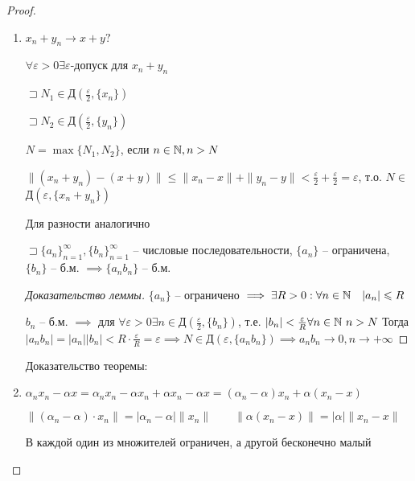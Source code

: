     \begin{proof}
        \begin{enumerate}
            \item $x_{n} + y_{n} \to  x+y? $

                $\forall \varepsilon>0 \exists \varepsilon$-допуск для $x_{n} +y_{n} $

                $\sqsupset N_1\in $Д$(\frac{\varepsilon}{2}, \{x_{n} \})$

                $\sqsupset N_2\in$Д$\left( \frac{\varepsilon}{2}, \{y_{n} \} \right) $

                $N = \max\{N_1, N_2\}$, если $n\in \mathbb{N} , n>N$

                $\|(x_{n} +y_{n} ) - (x+y)\|\leqslant \|x_{n} -x\| + \|y_{n} -y\| <\frac{\varepsilon}{2} + \frac{\varepsilon}{2} = \varepsilon$, т.о. $N\in $Д$\left( \varepsilon, \{x_{n} + y_{n} \} \right) $

                Для разности аналогично

                \begin{lemma}
                    $\sqsupset \{a_n\}_{n=1}^{\infty }, \{b_n\}_{n=1}^{\infty }    $ -- числовые последовательности, $\{a_n\}$ -- ограничена, $\{b_n\}$ -- б.м. $\implies  \{a_nb_n\}$ -- б.м.
                \end{lemma}
                \begin{proof}
                    [Доказательство леммы]

                    $\{a_n\}$ -- ограничено $\implies \exists R>0: \forall n\in \mathbb{N} \quad |a_n| \leqslant R$

                    $b_n$ -- б.м. $\implies $ для $\forall \varepsilon>0 \exists n\in \text{Д}\left( \frac{\varepsilon}{2}, \{b_n\} \right) $, т.е. $|b_n|<\frac{\varepsilon}{R} \forall n\in \mathbb{N}  ~ n>N$ Тогда $|a_nb_n| = |a_n| |b_n| <R\cdot \frac{\varepsilon}{R} = \varepsilon \implies N\in \text{Д}\left( \varepsilon, \{a_nb_n\} \right) \implies a_nb_n \to 0, n\to  +\infty  $
                \end{proof}
            Доказательство теоремы:

        \item $\alpha_nx_n - \alpha x = \alpha_nx_n - \alpha x_n + \alpha x_n - \alpha x = (\alpha_n-\alpha)x_n + \alpha(x_n - x)$

            $\|(\alpha_n - \alpha)\cdot x_n\| = |\alpha_n - \alpha|\|x_n\|\qquad \|\alpha(x_n-x)\| = |\alpha|\|x_n-x\|$

            В каждой один из множителей ограничен, а другой бесконечно малый


\end{enumerate}
\end{proof}
